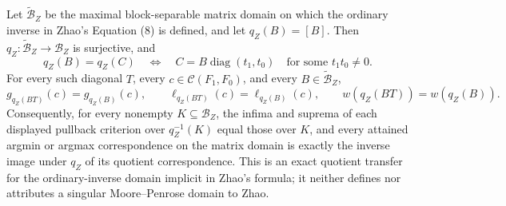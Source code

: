 Let \(\widetilde{\mathcal B}_Z\) be the maximal block-separable matrix domain on which the ordinary inverse in Zhao's Equation (8) is defined, and let \(q_Z(B)=[B]\).  Then \(q_Z:\widetilde{\mathcal B}_Z\to\mathcal B_Z\) is surjective, and
\[
q_Z(B)=q_Z(C)
\quad\Longleftrightarrow\quad
C=B\operatorname{diag}(t_1,t_0)
\quad\text{for some }t_1t_0\ne0.
\]
For every such diagonal \(T\), every \(c\in\mathcal C(F_1,F_0)\), and every \(B\in\widetilde{\mathcal B}_Z\),
\[
g_{q_Z(BT)}(c)=g_{q_Z(B)}(c),\qquad
\ell_{q_Z(BT)}(c)=\ell_{q_Z(B)}(c),\qquad
w(q_Z(BT))=w(q_Z(B)).
\]
Consequently, for every nonempty \(K\subseteq\mathcal B_Z\), the infima and suprema of each displayed pullback criterion over \(q_Z^{-1}(K)\) equal those over \(K\), and every attained argmin or argmax correspondence on the matrix domain is exactly the inverse image under \(q_Z\) of its quotient correspondence.  This is an exact quotient transfer for the ordinary-inverse domain implicit in Zhao's formula; it neither defines nor attributes a singular Moore--Penrose domain to Zhao.